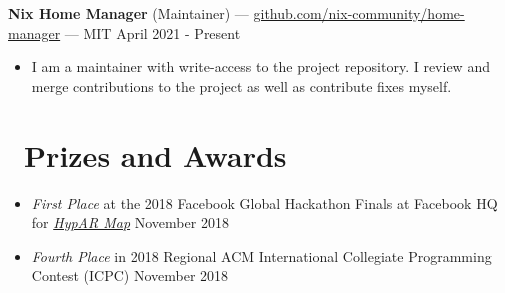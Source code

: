 \documentclass[10pt,letterpaper]{article}
\begin{document}
\textbf{Nix Home Manager} (Maintainer) ---
\href{https://github.com/nix-community/home-manager}{github.com/nix-community/home-manager}
--- MIT \hfill April 2021 - Present
\begin{itemize}
    \item I am a maintainer with write-access to the project repository. I
        review and merge contributions to the project as well as contribute
        fixes myself.

\end{itemize}

\section*{\faTrophy\ Prizes and Awards}
\begin{itemize}
    \item \textit{First Place} at the 2018 Facebook Global Hackathon Finals at
        Facebook HQ for
        \href{https://sumnerevans.com/pages/portfolio.html#HypAR-Map}{\textit{HypAR Map}}
        \hfill November 2018
    \item \textit{Fourth Place} in 2018 Regional ACM International Collegiate
        Programming Contest (ICPC) \hfill November 2018
\end{itemize}
\end{document}
